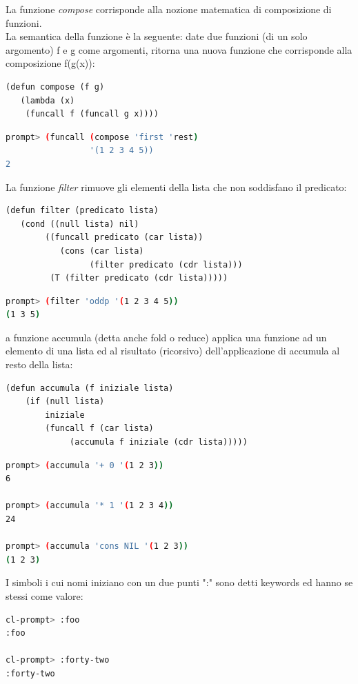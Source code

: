 \documentclass[a4paper,12pt, oneside]{book}
\begin{document}
La funzione \textit{compose} corrisponde alla nozione matematica di
composizione di funzioni. \\La semantica della funzione è la seguente: date due funzioni (di
un solo argomento) f e g come argomenti, ritorna una nuova
funzione che corrisponde alla composizione f(g(x)):
\begin{verbatim}
(defun compose (f g)
   (lambda (x)
    (funcall f (funcall g x))))
\end{verbatim}
\begin{shaded}
	\begin{lstlisting}[language=bash]
prompt> (funcall (compose 'first 'rest)
                 '(1 2 3 4 5))
2
\end{lstlisting}
\end{shaded}
La funzione \textit{filter} rimuove gli elementi della lista che non soddisfano il predicato:
\begin{verbatim}
(defun filter (predicato lista)
   (cond ((null lista) nil)
        ((funcall predicato (car lista))
           (cons (car lista)
                 (filter predicato (cdr lista)))
         (T (filter predicato (cdr lista)))))
\end{verbatim}
\begin{shaded}
	\begin{lstlisting}[language=bash]
prompt> (filter 'oddp '(1 2 3 4 5))
(1 3 5)
\end{lstlisting}
\end{shaded}
a funzione accumula (detta anche fold o reduce) applica una funzione ad
un elemento di una lista ed al risultato (ricorsivo) dell'applicazione di accumula
al resto della lista:
\begin{verbatim}
(defun accumula (f iniziale lista)
    (if (null lista)
        iniziale
        (funcall f (car lista)
             (accumula f iniziale (cdr lista)))))
\end{verbatim}
\begin{shaded}
	\begin{lstlisting}[language=bash]
prompt> (accumula '+ 0 '(1 2 3))
6

prompt> (accumula '* 1 '(1 2 3 4))
24

prompt> (accumula 'cons NIL '(1 2 3))
(1 2 3)
\end{lstlisting}
\end{shaded}
I simboli i cui nomi iniziano con un due punti ":" sono detti
keywords ed hanno se stessi come valore:
\begin{shaded}
	\begin{lstlisting}[language=bash]
cl-prompt> :foo
:foo
 
cl-prompt> :forty-two
:forty-two
\end{lstlisting}
\end{shaded}
\end{document}
